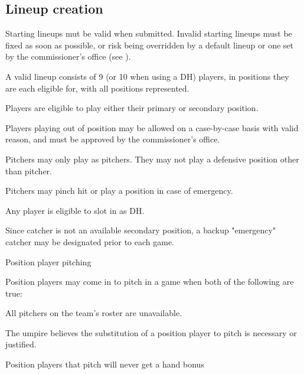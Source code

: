 \subsection{Lineup creation}
\label{sec:lineups}
\begin{deepEnumerate}
	\item Starting lineups mut be valid when submitted.
	Invalid starting lineups must be fixed as soon as possible,
	or risk being overridden by a default lineup
	or one set by the commissioner’s office (see ). 
	\begin{deepEnumerate}
		\item A valid lineup consists of 9 (or 10 when using a DH) players,
		in positions they are each eligible for, with all positions represented.
		\begin{deepEnumerate}
			\item Players are eligible to play either their primary or secondary position.
			\item Players playing out of position may be allowed 
			on a case-by-case basis with valid reason,
			and must be approved by the commissioner’s office.
		\end{deepEnumerate}
		\item Pitchers may only play as pitchers.
		They may not play a defensive position other than pitcher.
		\begin{deepEnumerate}
			\item Pitchers may pinch hit or play a position in case of emergency.
		\end{deepEnumerate}
		\item Any player is eligible to slot in as DH.
		\item Since catcher is not an available secondary position,
		a backup "emergency" catcher may be designated prior to each game.
		\item Position player pitching
		\begin{deepEnumerate}
			\item Position players may come in to pitch in a game
			when both of the following are true:
			\begin{deepEnumerate}
				\item All pitchers on the team's roster are unavailable.
				\item The umpire believes the substitution 
				of a position player to pitch is necessary or justified.
			\end{deepEnumerate}
			\item Position players that pitch will never get a hand bonus

\end{deepEnumerate}
\end{deepEnumerate}
\end{deepEnumerate}
